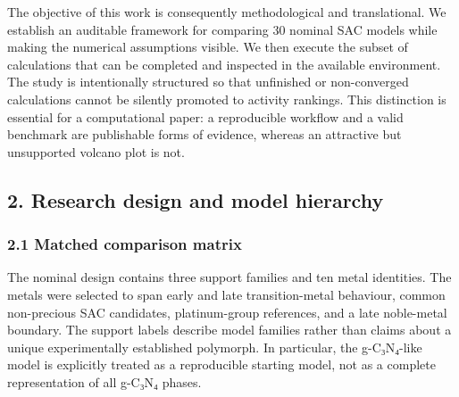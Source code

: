 \documentclass[
]{article}
\begin{document}
The objective of this work is consequently methodological and
translational. We establish an auditable framework for comparing 30
nominal SAC models while making the numerical assumptions visible. We
then execute the subset of calculations that can be completed and
inspected in the available environment. The study is intentionally
structured so that unfinished or non-converged calculations cannot be
silently promoted to activity rankings. This distinction is essential
for a computational paper: a reproducible workflow and a valid benchmark
are publishable forms of evidence, whereas an attractive but unsupported
volcano plot is not.

\hypertarget{research-design-and-model-hierarchy}{%
\subsection{2. Research design and model
hierarchy}\label{research-design-and-model-hierarchy}}

\hypertarget{matched-comparison-matrix}{%
\subsubsection{2.1 Matched comparison
matrix}\label{matched-comparison-matrix}}

The nominal design contains three support families and ten metal
identities. The metals were selected to span early and late
transition-metal behaviour, common non-precious SAC candidates,
platinum-group references, and a late noble-metal boundary. The support
labels describe model families rather than claims about a unique
experimentally established polymorph. In particular, the g-C₃N₄-like
model is explicitly treated as a reproducible starting model, not as a
complete representation of all g-C₃N₄ phases.
\end{document}
